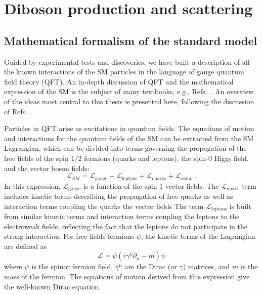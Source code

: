 \chapter{Diboson production and scattering}
\label{ch:phenomenology}

\section{Mathematical formalism of the standard model}
\label{sec:formalism}

Guided by experimental tests and
discoveries, we have built a description of all the known interactions 
of the SM particles in the language of gauge quantum field theory (QFT).
An in-depth discussion of QFT and the mathematical expression of the SM is
the subject of many textbooks, e.g., 
Refs.~\cite{Aitchison:2003tq,Srednicki:2007qs,Peskin:1995ev,Halzen:1984mc,Barger:1987nn}. 
An overview of the ideas
most central to this thesis is presented here, following the discussion
of Refs.~\cite{Quigg:2009vq,Peskin:1995ev}.

Particles in QFT arise as excitations in quantum fields.
The equations of motion and interactions for the quantum fields of the SM can
be extracted from the SM Lagrangian, which can be divided into 
terms governing the propagation of the free fields of the spin $1/2$ 
fermions (quarks and leptons), the spin-0 Higgs field, and the vector boson fields:
\begin{equation}
  \mathcal{L}_{SM} = \mathcal{L}_{\text{gauge}} + \mathcal{L}_{\text{leptons}} + 
      \mathcal{L}_{\text{quarks}} + \mathcal{L}_{\text{scalar}} \,.
  \label{eq:smlagrangian}
\end{equation}
In this expression, $\mathcal{L}_{\text{gauge}}$ is a function of the 
spin 1 vector fields.
The $\mathcal{L}_{\text{quark}}$ term includes kinetic terms describing the 
propagation of free quarks as well as interaction terms coupling the quarks
the vector fields
The term $\mathcal{L}_{\text{leptons}}$ is built from similar kinetic terms and 
interaction terms coupling the leptons to the electroweak fields, reflecting
the fact that the leptons do not participate in the strong interaction.
For free fields fermions $\psi$, the kinetic terms of the Lagrangian are defined as
\begin{equation}
  \mathcal{L} = \bar{\psi}(i\gamma^{\mu}\partial_\mu - m)\psi
  \label{eq:freeFermion}
\end{equation}
where $\psi$ is the spinor fermion field, $\gamma^{\mu}$ are the 
Dirac (or $\gamma$) matrices, and $m$ is the mass of the fermion. 
The equations of motion derived from this expression give the well-known
Dirac equation.

